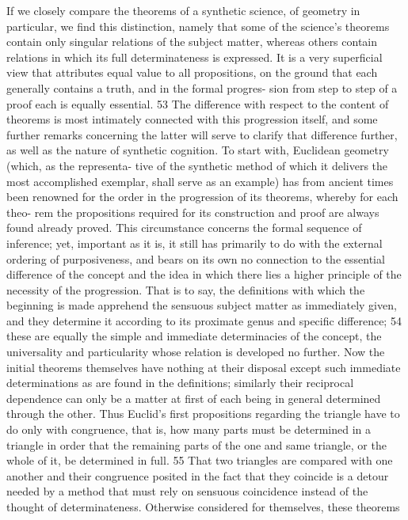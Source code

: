 If we closely compare the theorems of a synthetic science, of geometry
in particular, we find this distinction, namely that some of the science's
theorems contain only singular relations of the subject matter, whereas
others contain relations in which its full determinateness is expressed. It
is a very superficial view that attributes equal value to all propositions, on
the ground that each generally contains a truth, and in the formal progres-
sion from step to step of a proof each is equally essential. 53 The difference
with respect to the content of theorems is most intimately connected with
this progression itself, and some further remarks concerning the latter will
serve to clarify that difference further, as well as the nature of synthetic
cognition. To start with, Euclidean geometry (which, as the representa-
tive of the synthetic method of which it delivers the most accomplished
exemplar, shall serve as an example) has from ancient times been renowned
for the order in the progression of its theorems, whereby for each theo-
rem the propositions required for its construction and proof are always
found already proved. This circumstance concerns the formal sequence
of inference; yet, important as it is, it still has primarily to do with the
external ordering of purposiveness, and bears on its own no connection
to the essential difference of the concept and the idea in which there lies
a higher principle of the necessity of the progression.
That is to say,
the definitions with which the beginning is made apprehend the sensuous
subject matter as immediately given, and they determine it according to its
proximate genus and specific difference; 54 these are equally the simple and
immediate determinacies of the concept, the universality and particularity
whose relation is developed no further. Now the initial theorems themselves
have nothing at their disposal except such immediate determinations as are
found in the definitions; similarly their reciprocal dependence can only be
a matter at first of each being in general determined through the other.
Thus Euclid's first propositions regarding the triangle have to do only with
congruence, that is, how many parts must be determined in a triangle in order
that the remaining parts of the one and same triangle, or the whole of it, be
determined in full. 55 That two triangles are compared with one another and
their congruence posited in the fact that they coincide is a detour needed
by a method that must rely on sensuous coincidence instead of the thought
of determinateness. Otherwise considered for themselves, these theorems
